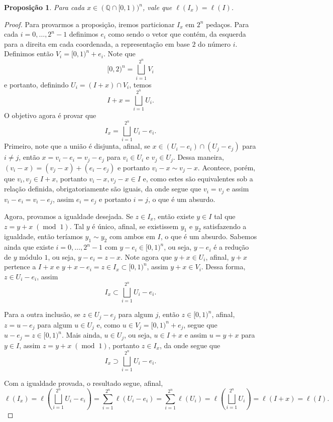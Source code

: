\documentclass{article}
\newtheorem{proposition}[definition]{Proposição}
\DeclareMathOperator{\ArithmeticMod}{mod}
\newcommand{\modulus}[1]{\phantom{.}(\ArithmeticMod\phantom{.}#1)}
\begin{document}
\begin{proposition}
    Para cada $x \in (\mathbb{Q} \cap [0,1))^n$, vale que $\ell(I_x) = \ell(I)$.
\end{proposition}
\begin{proof}
    Para provarmos a proposição, iremos particionar $I_x$ em $2^n$ pedaços. Para cada $i = 0, \dots, 2^n - 1$ definimos $e_i$ como sendo o vetor que contém, da esquerda para a direita em cada coordenada, a representação em base $2$ do número $i$. Definimos então $V_i = [0,1)^n + e_i$. Note que $$[0,2)^n = \bigsqcup_{i = 1}^{2^n} V_i$$ e portanto, definindo $U_i = (I + x) \cap V_i$, temos $$I + x = \bigsqcup_{i = 1}^{2^n} U_i.$$ O objetivo agora é provar que $$I_x = \bigsqcup_{i = 1}^{2^n} U_i - e_i.$$ Primeiro, note que a união é disjunta, afinal, se $x \in (U_i - e_i) \cap (U_j - e_j)$ para $i \neq j$, então $x = v_i - e_i = v_j - e_j$ para $v_i \in U_i$ e $v_j \in U_j$. Dessa maneira, $(v_i - x) = (v_j - x) + (e_i - e_j)$ e portanto $v_i - x \sim v_j - x$. Acontece, porém, que $v_i, v_j \in I+x$, portanto $v_i - x, v_j - x \in I$ e, como estes são equivalentes sob a relação definida, obrigatoriamente são iguais, da onde segue que $v_i = v_j$ e assim $v_i - e_i = v_i - e_j$, assim $e_i = e_j$ e portanto $i = j$, o que é um absurdo.

    Agora, provamos a igualdade desejada. Se $z \in I_x$, então existe $y \in I$ tal que $z = y + x \modulus{1}$. Tal $y$ é único, afinal, se existissem $y_1$ e $y_2$ satisfazendo a igualdade, então teríamos $y_1 \sim y_2$ com ambos em $I$, o que é um absurdo. Sabemos ainda que existe $i = 0, \dots, 2^n - 1$ com $y - e_i \in [0,1)^n$, ou seja, $y - e_i$ é a redução de $y$ módulo $1$, ou seja, $y - e_i = z - x$. Note agora que $y + x \in U_i$, afinal, $y + x$ pertence a $I + x$ e $y + x - e_i = z \in I_x \subset [0,1)^n$, assim $y + x \in V_i$. Dessa forma, $z \in U_i - e_i$, assim $$I_x \subset \bigsqcup_{i = 1}^{2^n} U_i - e_i.$$

    Para a outra inclusão, se $z \in U_j - e_j$ para algum $j$, então $z \in [0,1)^n$, afinal, $z = u - e_j$ para algum $u \in U_j$ e, como $u \in V_j = [0,1)^n + e_j$, segue que $u - e_j = z \in [0,1)^n$. Mais ainda, $u \in U_j$, ou seja, $u \in I + x$ e assim $u = y + x$ para $y \in I$, assim $z = y + x \modulus{1}$, portanto $z \in I_x$, da onde segue que $$I_x \supset \bigsqcup_{i = 1}^{2^n} U_i - e_i.$$

    Com a igualdade provada, o resultado segue, afinal, $$\ell(I_x) = \ell\left(\bigsqcup_{i = 1}^{2^n} U_i - e_i\right) = \sum_{i = 1}^{2^n} \ell(U_i - e_i) = \sum_{i = 1}^{2^n} \ell(U_i) = \ell\left(\bigsqcup_{i = 1}^{2^n} U_i\right) = \ell(I + x) = \ell(I).$$
\end{proof}
\end{document}
